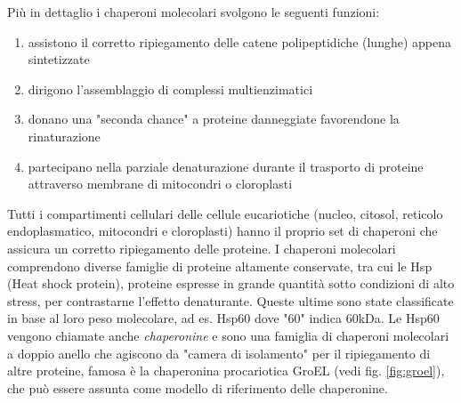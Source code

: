 {Più in dettaglio i chaperoni molecolari svolgono le seguenti funzioni:
\begin{enumerate}
	\item assistono il corretto ripiegamento delle catene polipeptidiche (lunghe) appena sintetizzate
	\item dirigono l'assemblaggio di complessi multienzimatici
	\item donano una "seconda chance" a proteine danneggiate favorendone la rinaturazione
	\item partecipano nella parziale denaturazione durante il trasporto di proteine attraverso membrane di mitocondri o cloroplasti
\end{enumerate}

Tutti i compartimenti cellulari delle cellule eucariotiche (nucleo, citosol, reticolo endoplasmatico, mitocondri e cloroplasti) hanno il proprio set di chaperoni che assicura un corretto ripiegamento delle proteine. I chaperoni molecolari comprendono diverse famiglie di proteine altamente conservate, tra cui le Hsp (Heat shock protein), proteine espresse in grande quantità sotto condizioni di alto stress, per contrastarne l'effetto denaturante. Queste ultime sono state classificate in base al loro peso molecolare, ad es. Hsp60 dove "60" indica 60kDa. Le Hsp60 vengono chiamate anche \textit{chaperonine} e sono una famiglia di chaperoni molecolari a doppio anello che agiscono da "camera di isolamento" per il ripiegamento di altre proteine\supercite{ranson1998chaperonins}, famosa è la chaperonina procariotica GroEL (vedi fig. \ref{fig:groel}), che può essere assunta come modello di riferimento delle chaperonine. 

\begin{figure}[h]
	
\end{figure}

}
